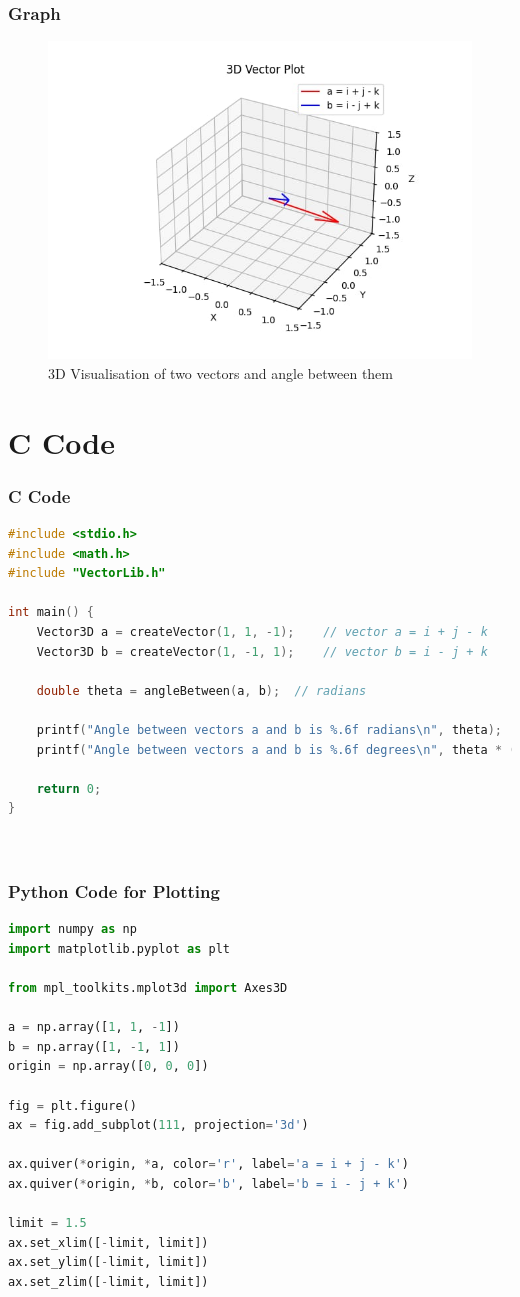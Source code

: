 \documentclass{beamer}
\theoremstyle{remark}
\numberwithin{equation}{section}
\begin{document}
\begin{frame}
    \frametitle{Graph}
    \begin{figure}[h!]
        \centering
        \includegraphics[width=0.7\linewidth]{FIG/graph.png}
        \caption{3D Visualisation of two vectors and angle between them}
    \end{figure}
\end{frame}
\section{ C Code}
\begin{frame}[fragile]
\frametitle{C Code }
\begin{lstlisting}[language=C]
#include <stdio.h>
#include <math.h>
#include "VectorLib.h"

int main() {
    Vector3D a = createVector(1, 1, -1);    // vector a = i + j - k
    Vector3D b = createVector(1, -1, 1);    // vector b = i - j + k

    double theta = angleBetween(a, b);  // radians

    printf("Angle between vectors a and b is %.6f radians\n", theta);
    printf("Angle between vectors a and b is %.6f degrees\n", theta * (180.0 / M_PI));

    return 0;
}

    
\end{lstlisting}
\end{frame}

\begin{frame}[fragile]
\frametitle{Python Code for Plotting}
\begin{lstlisting}[language=Python]
import numpy as np
import matplotlib.pyplot as plt

from mpl_toolkits.mplot3d import Axes3D

a = np.array([1, 1, -1])
b = np.array([1, -1, 1])
origin = np.array([0, 0, 0])

fig = plt.figure()
ax = fig.add_subplot(111, projection='3d')

ax.quiver(*origin, *a, color='r', label='a = i + j - k')
ax.quiver(*origin, *b, color='b', label='b = i - j + k')

limit = 1.5
ax.set_xlim([-limit, limit])
ax.set_ylim([-limit, limit])
ax.set_zlim([-limit, limit])

\end{lstlisting}

\end{frame}
\end{document}
